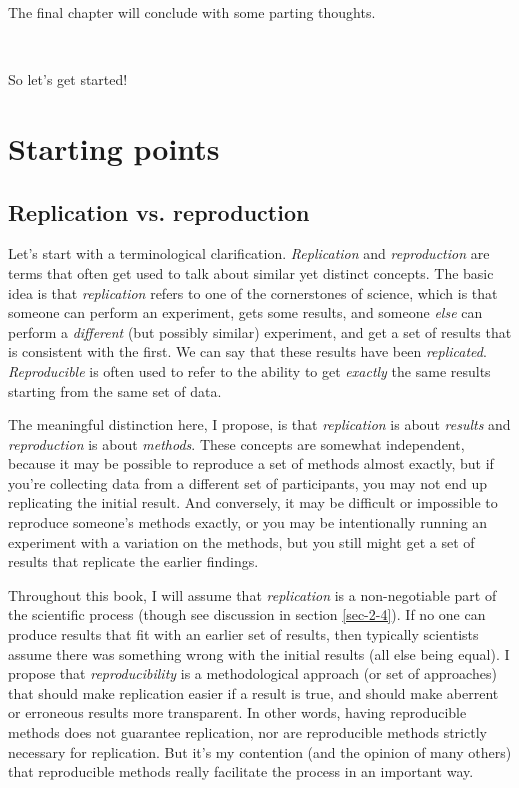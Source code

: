 \documentclass{book}
\begin{document}
The final chapter will conclude with some parting thoughts.

~

So let's get started!
\chapter{Starting points}
\label{sec-2}
\label{principles}
\section{Replication vs. reproduction}
\label{sec-2-1}
\label{replication-v-reproduction}

Let's start with a terminological clarification.  \emph{Replication} and \emph{reproduction} are terms that often get used to talk about similar yet distinct concepts.  The basic idea is that \emph{replication} refers to one of the cornerstones of science, which is that someone can perform an experiment, gets some results, and someone \emph{else} can perform a \emph{different} (but possibly similar) experiment, and get a set of results that is consistent with the first. We can say that these results have been \emph{replicated}.  \emph{Reproducible} is often used to refer to the ability to get \emph{exactly} the same results starting from the same set of data.

The meaningful distinction here, I propose, is that \emph{replication} is about \emph{results} and \emph{reproduction} is about \emph{methods}.  These concepts are somewhat independent, because it may be possible to reproduce a set of methods almost exactly, but if you're collecting data from a different set of participants, you may not end up replicating the initial result.  And conversely, it may be difficult or impossible to reproduce someone's methods exactly, or you may be intentionally running an experiment with a variation on the methods, but you still might get a set of results that replicate the earlier findings.

Throughout this book, I will assume that \emph{replication} is a non-negotiable part of the scientific process (though see discussion in section \ref{sec-2-4}).  If no one can produce results that fit with an earlier set of results, then typically scientists assume there was something wrong with the initial results (all else being equal).  I propose that \emph{reproducibility} is a methodological approach (or set of approaches) that should make replication easier if a result is true, and should make aberrent or erroneous results more transparent.  In other words, having reproducible methods does not guarantee replication, nor are reproducible methods strictly necessary for replication. But it's my contention (and the opinion of many others) that reproducible methods really facilitate the process in an important way.
\end{document}
